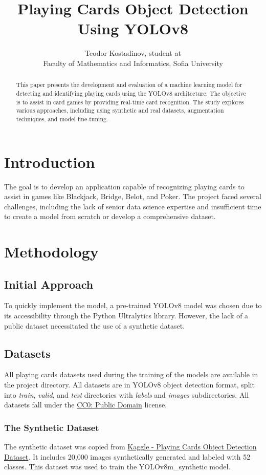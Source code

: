 \documentclass{article}
\title{Playing Cards Object Detection Using YOLOv8}
\author{Teodor Kostadinov, student at \\Faculty of Mathematics and Informatics, Sofia University}
\date{}
\begin{document}
\maketitle

\begin{abstract}
This paper presents the development and evaluation of a machine learning model for detecting and identifying playing cards using the YOLOv8 architecture. The objective is to assist in card games by providing real-time card recognition. The study explores various approaches, including using synthetic and real datasets, augmentation techniques, and model fine-tuning.
\end{abstract}

\section{Introduction}
The goal is to develop an application capable of recognizing playing cards to assist in games like Blackjack, Bridge, Belot, and Poker. The project faced several challenges, including the lack of senior data science expertise and insufficient time to create a model from scratch or develop a comprehensive dataset.

\section{Methodology}

\subsection{Initial Approach}
To quickly implement the model, a pre-trained YOLOv8 model was chosen due to its accessibility through the Python Ultralytics library. However, the lack of a public dataset necessitated the use of a synthetic dataset.

\subsection{Datasets}
All playing cards datasets used during the training of the models are available in the project directory. All datasets are in YOLOv8 object detection format, split into \textit{train}, \textit{valid}, and \textit{test} directories with \textit{labels} and \textit{images} subdirectories. All datasets fall under the \href{https://creativecommons.org/publicdomain/zero/1.0/}{CC0: Public Domain} license.

\subsubsection{The Synthetic Dataset}
The synthetic dataset was copied from \href{https://www.kaggle.com/datasets/andy8744/playing-cards-object-detection-dataset}{Kaggle - Playing Cards Object Detection Dataset}. It includes 20,000 images synthetically generated and labeled with 52 classes. This dataset was used to train the YOLOv8m\_synthetic model.
\end{document}
